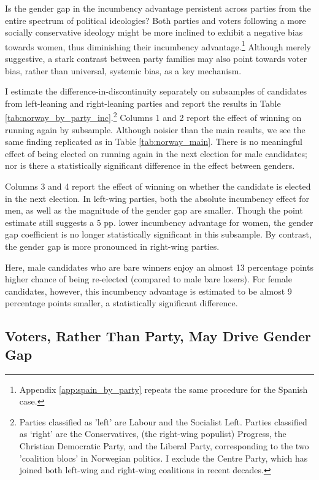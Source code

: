 \documentclass[12pt]{article}
\begin{document}


Is the gender gap in the incumbency advantage persistent across parties from the entire spectrum of political ideologies? Both parties and voters following a more socially conservative ideology might be more inclined to exhibit a negative bias towards women, thus diminishing their incumbency advantage.\footnote{Appendix \ref{app:spain_by_party} repeats the same procedure for the Spanish case. } Although merely suggestive, a stark contrast between party families may also point towards voter bias, rather than universal, systemic bias, as a key mechanism.

I estimate the difference-in-discontinuity separately on subsamples of candidates from left-leaning and right-leaning parties and report the results in Table \ref{tab:norway_by_party_inc}.\footnote{Parties classified as 'left' are Labour and the Socialist Left. Parties classified as `right' are the Conservatives, (the right-wing populist) Progress, the Christian Democratic Party, and the Liberal Party, corresponding to the two 'coalition blocs' in Norwegian politics. I exclude the Centre Party, which has joined both left-wing and right-wing coalitions in recent decades.}  Columns 1 and 2 report the effect of winning on running again by subsample. Although noisier than the main results, we see the same finding replicated as in Table \ref{tab:norway_main}. There is no meaningful effect of being elected on running again in the next election for male candidates; nor is there a statistically significant difference in the effect between genders.

Columns 3 and 4 report the effect of winning on whether the candidate is elected in the next election. In left-wing parties, both the absolute incumbency effect for men, as well as the magnitude of the gender gap are smaller. Though the point estimate still suggests a 5 pp. lower incumbency advantage for women, the gender gap coefficient is no longer statistically significant in this subsample. By contrast, the gender gap is more pronounced in right-wing parties.

Here, male candidates who are bare winners enjoy an almost 13 percentage points higher chance of being re-elected (compared to male bare losers). For female candidates, however, this incumbency advantage is estimated to be almost 9 percentage points smaller, a statistically significant difference.


\subsection{Voters, Rather Than Party, May Drive Gender Gap}
\end{document}
